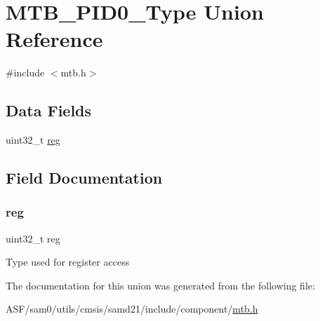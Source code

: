 \hypertarget{union_m_t_b___p_i_d0___type}{}\section{M\+T\+B\+\_\+\+P\+I\+D0\+\_\+\+Type Union Reference}
\label{union_m_t_b___p_i_d0___type}


{\ttfamily \#include $<$mtb.\+h$>$}

\subsection*{Data Fields}
\begin{DoxyCompactItemize}
\item 
uint32\+\_\+t \mbox{\hyperlink{union_m_t_b___p_i_d0___type_a6b91636401516a477989a336376d7b40}{reg}}
\end{DoxyCompactItemize}


\subsection{Field Documentation}
\mbox{\label{union_m_t_b___p_i_d0___type_a6b91636401516a477989a336376d7b40}} 
\subsubsection{\texorpdfstring{reg}{reg}}
{\footnotesize\ttfamily uint32\+\_\+t reg}

Type used for register access 

The documentation for this union was generated from the following file\+:\begin{DoxyCompactItemize}
\item 
A\+S\+F/sam0/utils/cmsis/samd21/include/component/\mbox{\hyperlink{component_2mtb_8h}{mtb.\+h}}\end{DoxyCompactItemize}

